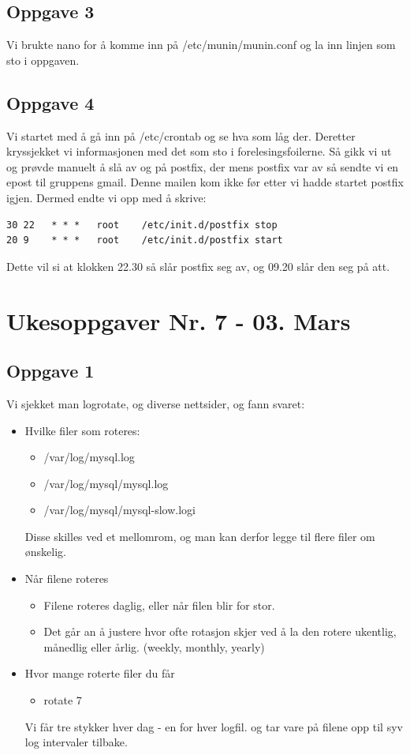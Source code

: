 \documentclass[a4paper, norsk, 12pt]{article}
\begin{document}
\subsection{Oppgave 3}
Vi brukte nano for å komme inn på /etc/munin/munin.conf og la inn linjen som sto i oppgaven.

\subsection{Oppgave 4}
Vi startet med å gå inn på /etc/crontab og se hva som låg der. Deretter kryssjekket vi informasjonen med det som sto i forelesingsfoilerne. Så gikk vi ut og prøvde manuelt å slå av og på postfix, der mens postfix var av så sendte vi en epost til gruppens gmail. Denne mailen kom ikke før etter vi hadde startet postfix igjen. Dermed endte vi opp med å skrive:
\begin{verbatim}
30 22   * * *   root    /etc/init.d/postfix stop
20 9    * * *   root    /etc/init.d/postfix start
\end{verbatim}
Dette vil si at klokken 22.30 så slår postfix seg av, og 09.20 slår den seg på att.


\section{Ukesoppgaver Nr. 7 - 03. Mars}
\subsection{Oppgave 1}
Vi sjekket man logrotate, og diverse nettsider, og fann svaret:
\begin{itemize}
\item Hvilke filer som roteres:
\begin{itemize}
\item /var/log/mysql.log
\item /var/log/mysql/mysql.log
\item /var/log/mysql/mysql-slow.logi
\end{itemize}
Disse skilles ved et mellomrom, og man kan derfor legge til flere filer om ønskelig.

\item Når filene roteres
\begin{itemize}
\item Filene roteres daglig, eller når filen blir for stor.
\item Det går an å justere hvor ofte rotasjon skjer ved å la den rotere ukentlig, månedlig eller årlig. (weekly, monthly, yearly)
\end{itemize}
\item Hvor mange roterte filer du får
\begin{itemize}
\item rotate 7
\end{itemize}
Vi får tre stykker hver dag - en for hver logfil. og tar vare på filene opp til syv log intervaler tilbake.
\end{itemize}
\end{document}
